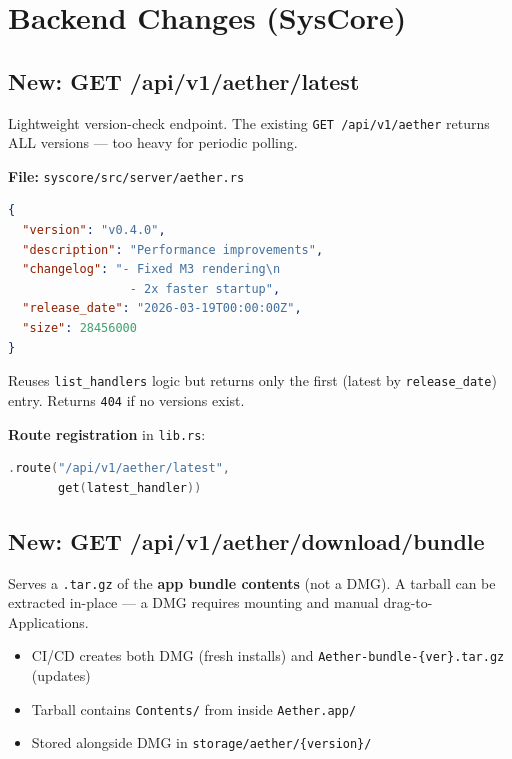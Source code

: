 \documentclass[11pt, a4paper]{article}
\begin{document}
\section{Backend Changes (SysCore)}
\label{sec:backend}

\subsection{New: GET /api/v1/aether/latest}

Lightweight version-check endpoint. The existing \texttt{GET /api/v1/aether} returns ALL versions --- too heavy for periodic polling.

\textbf{File:} \texttt{syscore/src/server/aether.rs}

\begin{lstlisting}[language=json, title=Response]
{
  "version": "v0.4.0",
  "description": "Performance improvements",
  "changelog": "- Fixed M3 rendering\n
                 - 2x faster startup",
  "release_date": "2026-03-19T00:00:00Z",
  "size": 28456000
}
\end{lstlisting}

Reuses \texttt{list\_handlers} logic but returns only the first (latest by \texttt{release\_date}) entry. Returns \texttt{404} if no versions exist.

\textbf{Route registration} in \texttt{lib.rs}:
\begin{lstlisting}[language=C]
.route("/api/v1/aether/latest",
       get(latest_handler))
\end{lstlisting}

\subsection{New: GET /api/v1/aether/download/bundle}

Serves a \texttt{.tar.gz} of the \textbf{app bundle contents} (not a DMG). A tarball can be extracted in-place --- a DMG requires mounting and manual drag-to-Applications.

\begin{itemize}[nosep, leftmargin=*]
  \item CI/CD creates both DMG (fresh installs) and \texttt{Aether-bundle-\{ver\}.tar.gz} (updates)
  \item Tarball contains \texttt{Contents/} from inside \texttt{Aether.app/}
  \item Stored alongside DMG in \texttt{storage/aether/\{version\}/}
\end{itemize}
\end{document}
